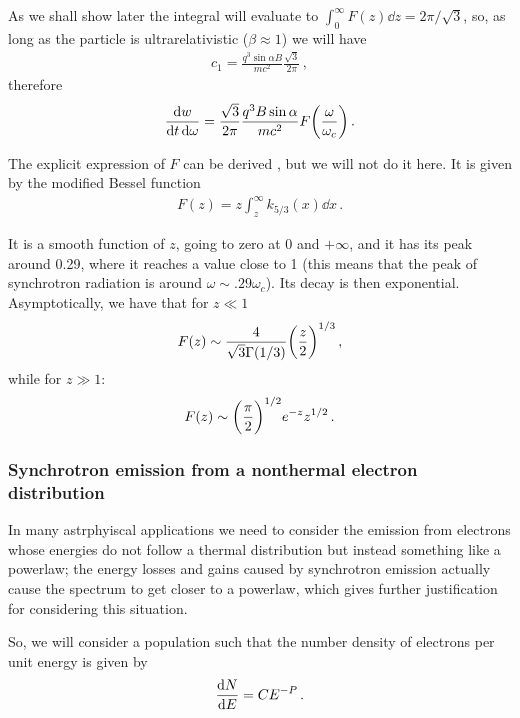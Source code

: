 \documentclass[main.tex]{subfiles}
\begin{document}
As we shall show later the integral will evaluate to \(\int_0^{ \infty } F(z) \dd{z} = 2 \pi / \sqrt{3}\), so, as long as the particle is ultrarelativistic (\(\beta \approx 1\)) we will have 
%
\begin{align}
c_1 = \frac{q^3 \sin \alpha B}{mc^2} \frac{\sqrt{3}}{ 2 \pi }
\,,
\end{align}
%
therefore 
%
\begin{align}
\frac{ \dd{w}}{ \dd{t} \dd{\omega }} = \frac{\sqrt{3}}{ 2 \pi }
\frac{q^3 B \sin \alpha }{mc^2} F \qty( \frac{\omega }{\omega _c})
\,.
\end{align}

The explicit expression of \(F\) can be derived \cite[par.\ 6.4]{rybickiRadiativeProcessesAstrophysics1979}, but we will not do it here. It is given by the modified Bessel function 
%
\begin{align}
F(z) =  z \int_{z}^{\infty } k_{5/3} (x) \dd{x}
\,.
\end{align}

It is a smooth function of \(z\), going to zero at 0 and \(+ \infty \), and it has its peak around \num{.29}, where it reaches a value close to 1 (this means that the peak of synchrotron radiation is around \(\omega \sim \num{.29} \omega _c\)). Its decay is then exponential.
Asymptotically, we have that for \(z \ll 1\) 
%
\begin{align}
F(z) \sim \frac{4}{\sqrt{3} \Gamma (1/3)} \qty(\frac{z}{2})^{1/3}
\,,
\end{align}
%
while for \(z \gg 1\): 
%
\begin{align}
F(z) \sim \qty(\frac{\pi }{2})^{1/2} e^{-z} z^{1/2}
\,.
\end{align}

\subsubsection{Synchrotron emission from a nonthermal electron distribution}

In many astrphyiscal applications we need to consider the emission from electrons whose energies do not follow a thermal distribution but instead something like a powerlaw; the energy losses and gains caused by synchrotron emission actually cause the spectrum to get closer to a powerlaw, which gives further justification for considering this situation.

So, we will consider a population such that the number density of electrons per unit energy is given by
%
\begin{align}
\dv{N}{E} = C E^{-P}
\,.
\end{align}
\end{document}
